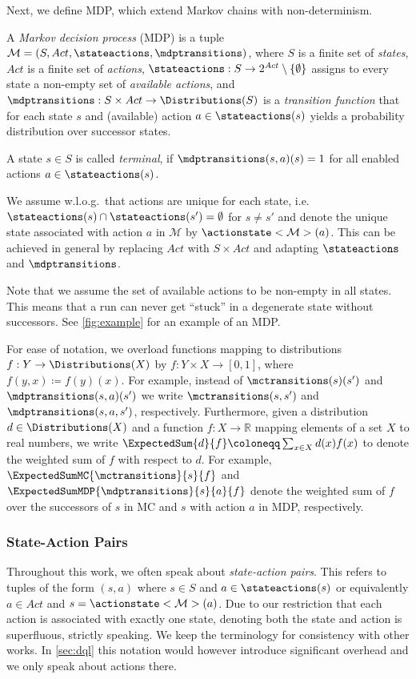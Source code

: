 \documentclass{theoretics}
\newcommand{\intersectionSym}{\cap}
\newcommand{\intersectionBin}{\mathbin{\intersectionSym}}
\newcommand{\intersection}{\intersectionBin}
\newcommand{\Reals}{\mathbb{R}}
\newcommand{\distribution}{d}
\newcommand{\MDP}{\mathcal{M}}
\newcommand{\States}{S}
\newcommand{\Actions}{Act}
\begin{document}
Next, we define MDP, which extend Markov chains with non-determinism.
\begin{definition}
	A \emph{Markov decision process} (MDP) is a tuple $\MDP = (\States, \Actions, \stateactions, \mdptransitions)$, where
		$\States$ is a finite set of \emph{states},
		$\Actions$ is a finite set of \emph{actions},
		$\stateactions: \States \to 2^{\Actions} \setminus \{\emptyset\}$ assigns to every state a non-empty set of \emph{available actions}, and
		$\mdptransitions: \States \times \Actions \to \Distributions(\States)$ is a \emph{transition function} that for each state $s$ and (available) action $a \in \stateactions(s)$ yields a probability distribution over successor states.

	A state $s \in \States$ is called \emph{terminal}, if $\mdptransitions(s, a)(s) = 1$ for all enabled actions $a \in \stateactions(s)$.
\end{definition}
\begin{remark}
	We assume w.l.o.g.\ that actions are unique for each state, i.e.\ $\stateactions(s) \intersection \stateactions(s') = \emptyset$ for $s \neq s'$ and denote the unique state associated with action $a$ in $\MDP$ by $\actionstate<\MDP>(a)$.
	This can be achieved in general by replacing $\Actions$ with $\States \times \Actions$ and adapting $\stateactions$ and $\mdptransitions$.
\end{remark}
Note that we assume the set of available actions to be non-empty in all states.
This means that a run can never get \enquote{stuck} in a degenerate state without successors.
See \cref{fig:example} for an example of an MDP.

For ease of notation, we overload functions mapping to distributions $f: Y \to \Distributions(X)$ by $f: Y \times X \to [0, 1]$, where $f(y, x) \coloneqq f(y)(x)$.
For example, instead of $\mctransitions(s)(s')$ and $\mdptransitions(s, a)(s')$ we write $\mctransitions(s, s')$ and $\mdptransitions(s, a, s')$, respectively.
Furthermore, given a distribution $\distribution \in \Distributions(X)$ and a function $f : X \to \Reals$ mapping elements of a set $X$ to real numbers, we write $\ExpectedSum{\distribution}{f} \coloneqq \sum_{x \in X} \distribution(x) f(x)$ to denote the weighted sum of $f$ with respect to $\distribution$.
For example, $\ExpectedSumMC{\mctransitions}{s}{f}$ and $\ExpectedSumMDP{\mdptransitions}{s}{a}{f}$ denote the weighted sum of $f$ over the successors of $s$ in MC and $s$ with action $a$ in MDP, respectively.

\subsubsection*{State-Action Pairs}
Throughout this work, we often speak about \emph{state-action pairs}.
This refers to tuples of the form $(s, a)$ where $s \in \States$ and $a \in \stateactions(s)$ or equivalently $a \in \Actions$ and $s = \actionstate<\MDP>(a)$.
Due to our restriction that each action is associated with exactly one state, denoting both the state and action is superfluous, strictly speaking.
We keep the terminology for consistency with other works.
In \cref{sec:dql} this notation would however introduce significant overhead and we only speak about actions there.
\end{document}
